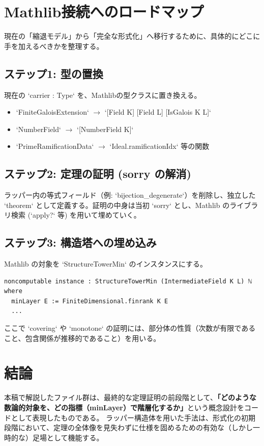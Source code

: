 \documentclass[a4paper,11pt]{ltjsarticle}
\theoremstyle{definition}
\begin{document}
\section{Mathlib接続へのロードマップ}

現在の「縮退モデル」から「完全な形式化」へ移行するために、具体的にどこに手を加えるべきかを整理する。

\subsection{ステップ1: 型の置換}
現在の `carrier : Type` を、Mathlibの型クラスに置き換える。
\begin{itemize}
    \item `FiniteGaloisExtension` $\to$ `[Field K] [Field L] [IsGalois K L]`
    \item `NumberField` $\to$ `[NumberField K]`
    \item `PrimeRamificationData` $\to$ `Ideal.ramificationIdx` 等の関数
\end{itemize}

\subsection{ステップ2: 定理の証明 (sorry の解消)}
ラッパー内の等式フィールド（例: `bijection_degenerate`）を削除し、独立した `theorem` として定義する。証明の中身は当初 `sorry` とし、Mathlib のライブラリ検索 (`apply?` 等) を用いて埋めていく。

\subsection{ステップ3: 構造塔への埋め込み}
Mathlib の対象を `StructureTowerMin` のインスタンスにする。
\begin{lstlisting}
noncomputable instance : StructureTowerMin (IntermediateField K L) ℕ where
  minLayer E := FiniteDimensional.finrank K E
  ...
\end{lstlisting}
ここで `covering` や `monotone` の証明には、部分体の性質（次数が有限であること、包含関係が推移的であること）を用いる。

\section{結論}

本稿で解説したファイル群は、最終的な定理証明の前段階として、\textbf{「どのような数論的対象を、どの指標（minLayer）で階層化するか」}という概念設計をコードとして表現したものである。
ラッパー構造体を用いた手法は、形式化の初期段階において、定理の全体像を見失わずに仕様を固めるための有効な（しかし一時的な）足場として機能する。
\end{document}
